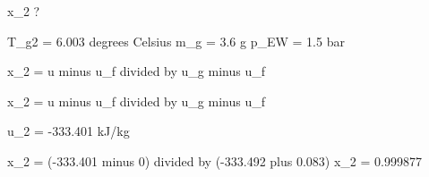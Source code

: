 x_2 ?  

T_g2 = 6.003 degrees Celsius  
m_g = 3.6 g  
p_EW = 1.5 bar  

x_2 = u minus u_f divided by u_g minus u_f  

x_2 = u minus u_f divided by u_g minus u_f  

u_2 = -333.401 kJ/kg  

x_2 = (-333.401 minus 0) divided by (-333.492 plus 0.083)  
x_2 = 0.999877